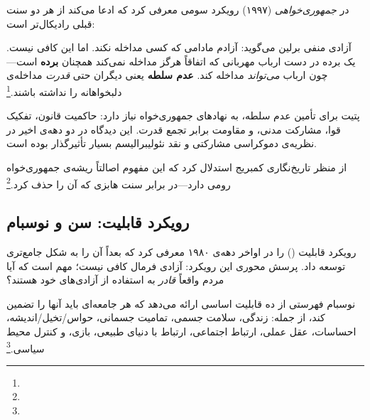  در \textit{جمهوری‌خواهی} (۱۹۹۷) رویکرد سومی معرفی کرد که ادعا می‌کند از هر دو سنت قبلی رادیکال‌تر است:

\begin{tcolorbox}[defbox, title={آزادی به مثابه عدم سلطه}]
آزادی منفی برلین می‌گوید: آزادم مادامی که کسی مداخله نکند. اما این کافی نیست. یک برده در دست ارباب مهربانی که اتفاقاً هرگز مداخله نمی‌کند همچنان \textbf{برده} است—چون ارباب \textit{می‌تواند} مداخله کند. \textbf{عدم سلطه} یعنی دیگران حتی \textit{قدرت} مداخله‌ی دلبخواهانه را نداشته باشند.\footnote{} %
\end{tcolorbox}

پتیت برای تأمین عدم سلطه، به نهادهای جمهوری‌خواه نیاز دارد: حاکمیت قانون، تفکیک قوا، مشارکت مدنی، و مقاومت برابر تجمع قدرت. این دیدگاه در دو دهه‌ی اخیر در نظریه‌ی دموکراسی مشارکتی و نقد نئولیبرالیسم بسیار تأثیرگذار بوده است.

 از منظر تاریخ‌نگاری کمبریج استدلال کرد که این مفهوم اصالتاً ریشه‌ی جمهوری‌خواه رومی دارد—در برابر سنت هابزی که آن را حذف کرد.\footnote{} %

\subsection{رویکرد قابلیت: سن و نوسبام}
\label{subsec:capability}

 رویکرد قابلیت () را در اواخر دهه‌ی ۱۹۸۰ معرفی کرد که بعداً  آن را به شکل جامع‌تری توسعه داد. پرسش محوری این رویکرد: آزادی فرمال کافی نیست؛ مهم است که آیا مردم واقعاً \textit{قادر} به استفاده از آزادی‌های خود هستند؟

\begin{tcolorbox}[defbox, title={قابلیت‌های مرکزی نوسبام}]
\small
نوسبام فهرستی از ده قابلیت اساسی ارائه می‌دهد که هر جامعه‌ای باید آنها را تضمین کند، از جمله: زندگی، سلامت جسمی، تمامیت جسمانی، حواس/تخیل/اندیشه، احساسات، عقل عملی، ارتباط اجتماعی، ارتباط با دنیای طبیعی، بازی، و کنترل محیط سیاسی.\footnote{} %
\end{tcolorbox}


